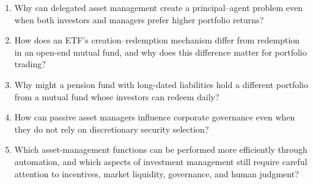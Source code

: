 \begin{enumerate}

\item Why can delegated asset management create a principal--agent problem even when both investors and managers prefer higher portfolio returns?

\item How does an ETF's creation--redemption mechanism differ from redemption in an open-end mutual fund, and why does this difference matter for portfolio trading?

\item Why might a pension fund with long-dated liabilities hold a different portfolio from a mutual fund whose investors can redeem daily?

\item How can passive asset managers influence corporate governance even when they do not rely on discretionary security selection?

\item Which asset-management functions can be performed more
efficiently through automation, and which aspects of investment management still require careful attention to incentives, market liquidity, governance, and human judgment?

\end{enumerate}



